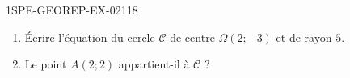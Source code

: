 \begin{exercice}{1SPE-GEOREP-EX-021}{1}{8}
\begin{enumerate}
  \item Écrire l'équation du cercle $\mathcal{C}$ de centre $\Omega(2 ; -3)$ et de rayon $5$.
  \item Le point $A(2 ; 2)$ appartient-il à $\mathcal{C}$ ?
\end{enumerate}
\end{exercice}
